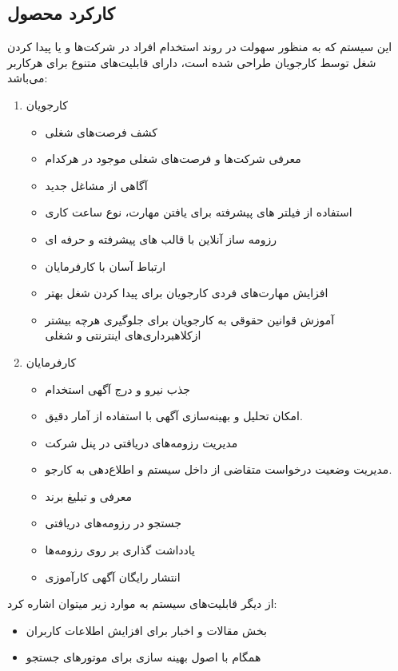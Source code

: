 \documentclass{report}
\begin{document}
			\subsection{کارکرد محصول}
				این سیستم که به منظور سهولت در روند استخدام افراد در شرکت‌ها و یا پیدا کردن شغل توسط کارجویان طراحی شده‌ است، دارای قابلیت‌های متنوع برای هرکاربر می‌باشد:
				\begin{enumerate}
					\item کارجویان
						\begin{itemize}
							\item 
							کشف فرصت‌های شغلی
							\item 
							معرفی شرکت‌ها و فرصت‌های شغلی موجود در هرکدام
							\item 
							آگاهی از مشاغل جدید
							\item 
							استفاده از فیلتر های پیشرفته برای یافتن مهارت، نوع ساعت کاری
							\item 
							رزومه ساز آنلاین با قالب های پیشرفته و حرفه ای
							\item 
							 ارتباط آسان با کارفرمایان
							\item 
							افزایش  مهارت‌های فردی کارجویان برای پیدا کردن شغل بهتر
							\item 
							آموزش قوانین حقوقی به کارجویان برای جلوگیری هرچه بیشتر ازکلاهبرداری‌های اینترنتی و شغلی
						\end{itemize}
					
					\item کارفرمایان
						\begin{itemize}
							\item 
							جذب نیرو و درج آگهی استخدام
							\item 
							امکان تحلیل و بهینه‌سازی آگهی با استفاده از آمار دقیق.
							\item 
							مدیریت رزومه‌های دریافتی در پنل شرکت
							\item 
							مدیریت وضعیت درخواست متقاضی از داخل سیستم و اطلاع‌دهی به کارجو.
							\item 
							معرفی و تبلیغ برند
							\item 
							جستجو در رزومه‌های دریافتی
							\item 
							یادداشت گذاری بر روی رزومه‌ها
							\item 
							انتشار رایگان آگهی‌ کارآموزی
						\end{itemize}
				\end{enumerate}
			
			از دیگر قابلیت‌های سیستم به موارد زیر میتوان اشاره کرد:
			\begin{itemize}
				\item بخش مقالات و اخبار برای افزایش اطلاعات کاربران
				\item همگام با اصول بهینه سازی برای موتورهای جستجو
			\end{itemize}
		
\end{document}
